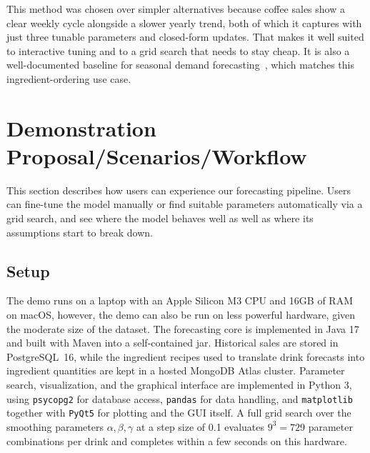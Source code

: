 \documentclass[conference]{IEEEtran}
\begin{document}
This method was chosen over simpler alternatives because coffee sales show a clear weekly cycle alongside a slower yearly trend, both of which it captures with just three tunable parameters and closed-form updates. That makes it well suited to interactive tuning and to a grid search that needs to stay cheap. It is also a well-documented baseline for seasonal demand forecasting~\cite{holt2004,gardner1985exponential,hyndman2018forecasting}, which matches this ingredient-ordering use case.

\section{Demonstration Proposal/Scenarios/Workflow}
This section describes how users can experience our forecasting pipeline. Users can fine-tune the model manually or find suitable parameters automatically via a grid search, and see where the model behaves well as well as where its assumptions start to break down.
\subsection{Setup}\label{subsec:setup}
The demo runs on a laptop with an Apple Silicon M3 CPU and 16GB of RAM on macOS, however, the demo can also be run on less powerful hardware, given the moderate size of the dataset.
The forecasting core is implemented in Java 17 and built with Maven into a self-contained jar. Historical sales are stored in PostgreSQL~16, while the ingredient recipes used to translate drink forecasts into ingredient quantities are kept in a hosted MongoDB Atlas cluster. 
Parameter search, visualization, and the graphical interface are implemented in Python 3, using \texttt{psycopg2} for database access, \texttt{pandas} for data handling, and \texttt{matplotlib} together with \texttt{PyQt5} for plotting and the GUI itself. 
A full grid search over the smoothing parameters $\alpha,\beta,\gamma$ at a step size of 0.1 evaluates $9^3=729$ parameter combinations per drink and completes within a few seconds on this hardware.
\end{document}
